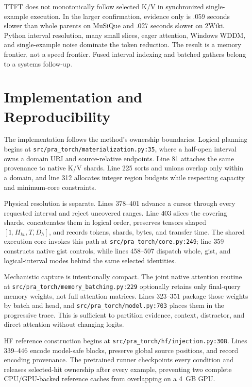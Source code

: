 \documentclass[11pt]{article}
\begin{document}
TTFT does not monotonically follow selected K/V in synchronized single-example execution.  In the
larger confirmation, evidence only is .059 seconds slower than whole parents on MuSiQue and .027
seconds slower on 2Wiki.
Python interval resolution, many small slices, eager attention, Windows WDDM, and single-example
noise dominate the token reduction.  The result is a memory frontier, not a speed frontier.  Fused
interval indexing and batched gathers belong to a systems follow-up.

\section{Implementation and Reproducibility}

The implementation follows the method's ownership boundaries.  Logical planning begins at
\texttt{src/pra\_torch/materialization.py:35}, where a half-open interval owns a domain URI and
source-relative endpoints.  Line 81 attaches the same provenance to native K/V shards.  Line 225
sorts and unions overlap only within a domain, and line 312 allocates integer region budgets while
respecting capacity and minimum-core constraints.

Physical resolution is separate.  Lines 378--401 advance a cursor through every requested
interval and reject uncovered ranges.  Line 403 slices the covering shards, concatenates them in
logical order, preserves tensors shaped $[1,H_{kv},T,D_h]$, and records tokens, shards, bytes, and
transfer time.  The shared execution core invokes this path at
\texttt{src/pra\_torch/core.py:249}; line 359 constructs native gist controls, while lines
458--507 dispatch whole, gist, and logical-interval modes behind the same selected identities.

Mechanistic capture is intentionally compact.  The joint native attention routine at
\texttt{src/pra\_torch/memory\_batching.py:229} optionally retains only final-query memory weights,
not full attention matrices.  Lines 323--351 package those weights by batch and head, and
\texttt{src/pra\_torch/model.py:703} places them in the progressive trace.  This is sufficient to
partition evidence, context, distractor, and direct attention without changing logits.

HF reference construction begins at \texttt{src/pra\_torch/hf/injection.py:308}.  Lines 339--446
encode model-safe blocks, preserve global source positions, and record encoding provenance.  The
pretrained runner checkpoints every condition and releases selected-hit ownership after every
example, preventing two complete CPU/GPU-backed reference caches from overlapping on a 4~GB GPU.
\end{document}
